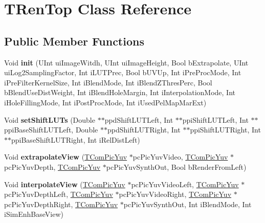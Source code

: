 \hypertarget{class_t_ren_top}{}\section{T\+Ren\+Top Class Reference}
\label{class_t_ren_top}
\subsection*{Public Member Functions}
\begin{DoxyCompactItemize}
\item 
\mbox{\label{class_t_ren_top_ad7c29b528e2bb432cece28e813ec7f2c}} 
Void {\bfseries init} (U\+Int ui\+Image\+Witdh, U\+Int ui\+Image\+Height, Bool b\+Extrapolate, U\+Int ui\+Log2\+Sampling\+Factor, Int i\+L\+U\+T\+Prec, Bool b\+U\+V\+Up, Int i\+Pre\+Proc\+Mode, Int i\+Pre\+Filter\+Kernel\+Size, Int i\+Blend\+Mode, Int i\+Blend\+Z\+Thres\+Perc, Bool b\+Blend\+Use\+Dist\+Weight, Int i\+Blend\+Hole\+Margin, Int i\+Interpolation\+Mode, Int i\+Hole\+Filling\+Mode, Int i\+Post\+Proc\+Mode, Int i\+Used\+Pel\+Map\+Mar\+Ext)
\item 
\mbox{\label{class_t_ren_top_abd3cf6033e3780a108d3f936eee1c9be}} 
Void {\bfseries set\+Shift\+L\+U\+Ts} (Double $\ast$$\ast$ppd\+Shift\+L\+U\+T\+Left, Int $\ast$$\ast$ppi\+Shift\+L\+U\+T\+Left, Int $\ast$$\ast$ppi\+Base\+Shift\+L\+U\+T\+Left, Double $\ast$$\ast$ppd\+Shift\+L\+U\+T\+Right, Int $\ast$$\ast$ppi\+Shift\+L\+U\+T\+Right, Int $\ast$$\ast$ppi\+Base\+Shift\+L\+U\+T\+Right, Int i\+Rel\+Dist\+Left)
\item 
\mbox{\label{class_t_ren_top_a84f907d5bb17069ebbd99aa313858324}} 
Void {\bfseries extrapolate\+View} (\hyperlink{class_t_com_pic_yuv}{T\+Com\+Pic\+Yuv} $\ast$pc\+Pic\+Yuv\+Video, \hyperlink{class_t_com_pic_yuv}{T\+Com\+Pic\+Yuv} $\ast$pc\+Pic\+Yuv\+Depth, \hyperlink{class_t_com_pic_yuv}{T\+Com\+Pic\+Yuv} $\ast$pc\+Pic\+Yuv\+Synth\+Out, Bool b\+Render\+From\+Left)
\item 
\mbox{\label{class_t_ren_top_ac4b09783d439c5694654eead5ebf678d}} 
Void {\bfseries interpolate\+View} (\hyperlink{class_t_com_pic_yuv}{T\+Com\+Pic\+Yuv} $\ast$pc\+Pic\+Yuv\+Video\+Left, \hyperlink{class_t_com_pic_yuv}{T\+Com\+Pic\+Yuv} $\ast$pc\+Pic\+Yuv\+Depth\+Left, \hyperlink{class_t_com_pic_yuv}{T\+Com\+Pic\+Yuv} $\ast$pc\+Pic\+Yuv\+Video\+Right, \hyperlink{class_t_com_pic_yuv}{T\+Com\+Pic\+Yuv} $\ast$pc\+Pic\+Yuv\+Depth\+Right, \hyperlink{class_t_com_pic_yuv}{T\+Com\+Pic\+Yuv} $\ast$pc\+Pic\+Yuv\+Synth\+Out, Int i\+Blend\+Mode, Int i\+Sim\+Enh\+Base\+View)

\end{DoxyCompactItemize}
